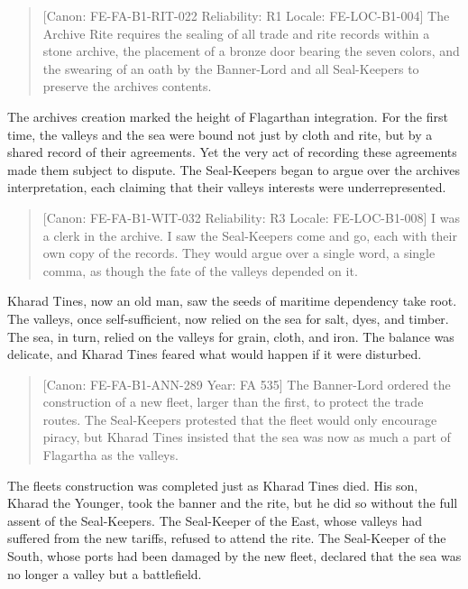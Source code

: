 \begin{quote}
{[}Canon: FE-FA-B1-RIT-022 \textbar{} Reliability: R1 \textbar{} Locale:
FE-LOC-B1-004{]} The Archive Rite requires the sealing of all trade and
rite records within a stone archive, the placement of a bronze door
bearing the seven colors, and the swearing of an oath by the Banner-Lord
and all Seal-Keepers to preserve the archive\textquotesingle s contents.
\end{quote}

The archive\textquotesingle s creation marked the height of Flagarthan
integration. For the first time, the valleys and the sea were bound not
just by cloth and rite, but by a shared record of their agreements. Yet
the very act of recording these agreements made them subject to dispute.
The Seal-Keepers began to argue over the archive\textquotesingle s
interpretation, each claiming that their valley\textquotesingle s
interests were underrepresented.

\begin{quote}
{[}Canon: FE-FA-B1-WIT-032 \textbar{} Reliability: R3 \textbar{} Locale:
FE-LOC-B1-008{]} I was a clerk in the archive. I saw the Seal-Keepers
come and go, each with their own copy of the records. They would argue
over a single word, a single comma, as though the fate of the valleys
depended on it.
\end{quote}

Kharad Tines, now an old man, saw the seeds of maritime dependency take
root. The valleys, once self-sufficient, now relied on the sea for salt,
dyes, and timber. The sea, in turn, relied on the valleys for grain,
cloth, and iron. The balance was delicate, and Kharad Tines feared what
would happen if it were disturbed.

\begin{quote}
{[}Canon: FE-FA-B1-ANN-289 \textbar{} Year: FA 535{]} The Banner-Lord
ordered the construction of a new fleet, larger than the first, to
protect the trade routes. The Seal-Keepers protested that the fleet
would only encourage piracy, but Kharad Tines insisted that the sea was
now as much a part of Flagartha as the valleys.
\end{quote}

The fleet\textquotesingle s construction was completed just as Kharad
Tines died. His son, Kharad the Younger, took the banner and the rite,
but he did so without the full assent of the Seal-Keepers. The
Seal-Keeper of the East, whose valleys had suffered from the new
tariffs, refused to attend the rite. The Seal-Keeper of the South, whose
ports had been damaged by the new fleet, declared that the sea was no
longer a valley but a battlefield.

